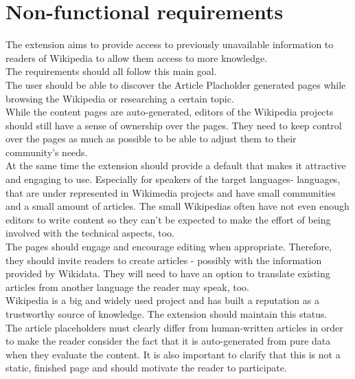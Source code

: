 \section{Non-functional requirements}

The extension aims to provide access to previously unavailable information to readers of Wikipedia to allow them access to more knowledge. \\
The requirements should all follow this main goal. \\
The user should be able to discover the Article Placholder generated pages while browsing the Wikipedia or researching a certain topic. \\
While the content pages are auto-generated, editors of the Wikipedia projects should still have a sense of ownership over the pages. They need to keep control over the pages as much as possible to be able to adjust them to their community's needs.  \\
At the same time the extension should provide a default that makes it attractive and engaging to use. Especially for speakers of the target languages- languages, that are under represented in Wikimedia projects and have small communities and a small amount of articles. The small Wikipedias often have not even enough editors to write content so they can't be expected to make the effort of being involved with the technical aspects, too.  \\
The pages should engage and encourage editing when appropriate. Therefore, they should invite readers to create articles - possibly with the information provided by Wikidata. They will need to have an option to translate existing articles from another language the reader may speak, too. \\
Wikipedia is a big and widely used project and has built a reputation as a trustworthy source of knowledge. The extension should maintain this status. \\
The article placeholders must clearly differ from human-written articles in order to make the reader consider the fact that it is auto-generated from pure data when they evaluate the content. It is also important to clarify that this is not a static, finished page and should motivate the reader to participate. \\